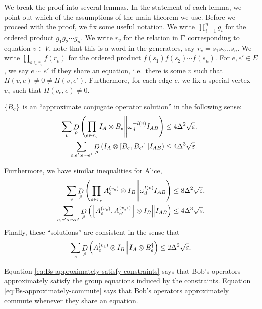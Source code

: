 We break the proof into several lemmas. In the statement of each lemma, we point out which of the assumptions of the main theorem we use. Before we proceed with the proof, we fix some useful notation.  We write $\prod_{i=1}^ng_i$ for the ordered product $g_1g_2\cdots g_n$. 
We write $r_v$ for the relation in $\Gamma$ corresponding to equation $v\in V$, note that this is a word in the generators, say $r_v = s_1s_2\ldots s_n$. We write $\prod_{s\in r_v}f(r_v)$ for the ordered product $f(s_1)f(s_2)\cdots f(s_n)$. 
For $e,e' \in E$, we say $e\sim e'$ if they share an equation, i.e.\ there is some $v$ such that $H(v,e) \neq 0 \neq H(v,e')$. Furthermore, for each edge $e$, we fix a special vertex $v_e$ such that $H(v_e,e)\neq 0$.


\begin{lemma}\label{lemma:Bs-are-approximate-conjugate-operator-solution}
	$\left\{B_e\right\}$ is an ``approximate conjugate operator solution'' in the following sense:
	\begin{align}
	\label{eq:Bs-approximately-satisfy-constraints}
		\sum_v \mathop{D}\limits_{\rho}\left(
		\prod_{e\in r_v} I_A\otimes B_e\middle\| \omega_d^{-l(v)}I_{AB}\right) 
		&\leq 4\Delta^2\sqrt{\varepsilon}.
		\\
	\label{eq:Bs-approximately-commute}
		\sum_{e,e':e\sim e'} \mathop{D}\limits_{\rho}\left(I_A\otimes [B_e,B_{e'}]\middle\| I_{AB}\right)
		&\leq 4\Delta^3\sqrt{\varepsilon}
		.\
	\end{align}

	Furthermore, we have similar inequalities for Alice, 
	\begin{align}
	\label{eq:As-approximately-satisfy-constraints}
		\sum_v\mathop{D}\limits_{\rho}\left(\prod_{e\in r_v}A_e^{(v_e)}\otimes I_B\middle\| \omega_d^{l(v)} I_{AB}\right)
		&\leq 8\Delta^2\sqrt{\varepsilon},
		\\
	\label{eq:As-approximately-commute}
		\sum_{e,e':e\sim e'} \mathop{D}\limits_{\rho}\left(\left[A_e^{(v_e)},A_{e'}^{(v_{e'})}\right]\otimes I_B\middle\| I_{AB}\right)
		&\leq 4\Delta^3\sqrt{\varepsilon}
		.
	\end{align}
	Finally, these ``solutions'' are consistent in the sense that
	\begin{equation}
	\label{eq:As-and-Bs-approximately-consistent}
		\sum_e \mathop{D}\limits_{\rho}\left(A_e^{(v_e)}\otimes I_B\middle\| I_A\otimes B_e^\dagger\right)
		 \leq 2 \Delta^2\sqrt{\varepsilon}.
	\end{equation}
\end{lemma}
Equation \eqref{eq:Bs-approximately-satisfy-constraints} says that Bob's operators approximately satisfy the group equations induced by the constraints. Equation \eqref{eq:Bs-approximately-commute} says that Bob's operators approximately commute whenever they share an equation.
